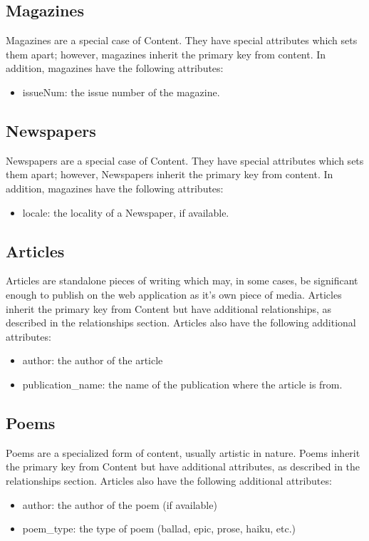 \documentclass[letter, 12pt, titlepage]{article}
\begin{document}
			\subsection{Magazines}
				Magazines are a special case of Content. They have special attributes which sets them apart; however, magazines inherit the primary key from content. In addition, magazines have the following attributes:
			\begin{itemize}
				\item issueNum: the issue number of the magazine.
			\end{itemize}		
			\subsection{Newspapers} 
				Newspapers are a special case of Content. They have special attributes which sets them apart; however, Newspapers inherit the primary key from content. In addition, magazines have the following attributes:
			\begin{itemize}
				\item locale: the locality of a Newspaper, if available.
			\end{itemize}	
			\subsection{Articles}		
			Articles are standalone pieces of writing which may, in some cases, be significant enough to publish on the web application as it's own piece of media. Articles inherit the primary key from Content but have additional relationships, as described in the relationships section. Articles also have the following additional attributes:
			\begin{itemize}
				\item author: the author of the article
				\item publication\_name: the name of the publication where the article is from.
			\end{itemize}
		\subsection{Poems}		
			Poems are a specialized form of content, usually artistic in nature. Poems inherit the primary key from Content but have additional attributes, as described in the relationships section. Articles also have the following additional attributes:
			\begin{itemize}
				\item author: the author of the poem (if available)
				\item poem\_type: the type of poem (ballad, epic, prose, haiku, etc.)
			\end{itemize}
					
\end{document}
